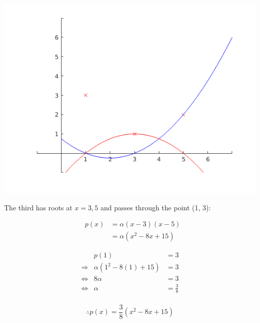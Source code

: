 \documentclass[MathsNotesBase.tex]{subfiles}
\begin{document}
{	
	\begin{center}
	\includegraphics[width=\linewidth]{figure_2.png}
	\end{center}
	
	
	\begin{par}
	\begin{flushleft}
	The third has roots at $x=3,5$ and passes through the point (1, 3):
	\end{flushleft}
	\end{par}
	
	\begin{par}
	$$\begin{array}{lcr}
	&p(x) &= \alpha(x-3)(x-5)\\
	&&= \alpha(x^2-8x+15)
	\end{array}$$
	\end{par}
	
	\begin{par}
	$$\begin{array}{lcr}
	&p(1)&=3 \\
	\Longrightarrow &\alpha(1^2-8(1) + 15) &= 3 \\
	\iff &8\alpha&=3\\
	\iff &\alpha &= \frac{3}{8}\\
	\end{array}$$
	\end{par}
	
	\begin{par}
	$$\therefore p(x) = \frac{3}{8}(x^2-8x+15)$$
	\end{par}
	
}
\end{document}
